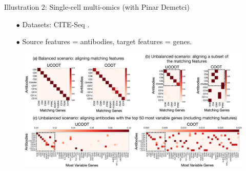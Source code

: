 \documentclass{beamer}
\begin{document}
\begin{frame}{Illustration 2: Single-cell multi-omics (with Pinar Demetci)}
\scriptsize
\begin{itemize}
  \item[$\bullet$] Datasets: CITE-Seq \parencite{CITEseq}.
  \item[$\bullet$] Source features = antibodies, target features = genes.
\end{itemize}
\vspace{-0.5cm}
\begin{figure}
      \centering
      \includegraphics[width=1.05\linewidth, keepaspectratio=true]{OT_new/genes-alignments.pdf}
  \end{figure}


\end{frame}
\end{document}
